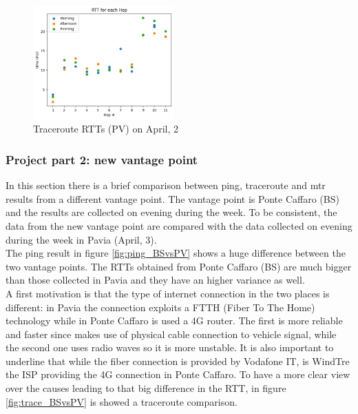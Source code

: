 \documentclass[a4paper,10pt]{article}
\begin{document}
\begin{multicols}{2}
        \begin{figure}[H]
                \centering
                \includegraphics[width=0.48\textwidth]{scatter_april_2.png}
                \caption{\small Traceroute RTTs (PV) on April, 2}
                \label{fig:Scatter_april_2}
        \end{figure}

\subsubsection{Project part 2: new vantage point}
In this section there is a brief comparison between ping, traceroute and mtr results from a different vantage point. The vantage point is Ponte Caffaro (BS) and
the results are collected on evening during the week. 
To be consistent, the data from the new vantage point are compared with the data collected on evening during the week in Pavia (April, 3).\\
The ping result in figure \ref{fig:ping_BSvsPV} shows a huge difference between the two vantage points. The RTTs obtained from Ponte Caffaro (BS) are much 
bigger than those collected in Pavia and they have an higher variance as well.\\
A first motivation is that the type of internet connection in the 
two places is different: in Pavia the connection exploits a FTTH (Fiber To The Home) technology while in Ponte Caffaro is used a 4G router. 
The first is more reliable and faster since makes use of physical cable connection to vehicle signal, while the second one uses radio waves so it is
more unstable. It is also important to underline that while the fiber connection is provided by Vodafone IT, is WindTre the ISP providing the 4G connection 
in Ponte Caffaro. To have a more clear view over the causes leading to that big difference in the RTT, in figure \ref{fig:trace_BSvsPV} is showed a traceroute comparison.

\end{multicols}
\end{document}
